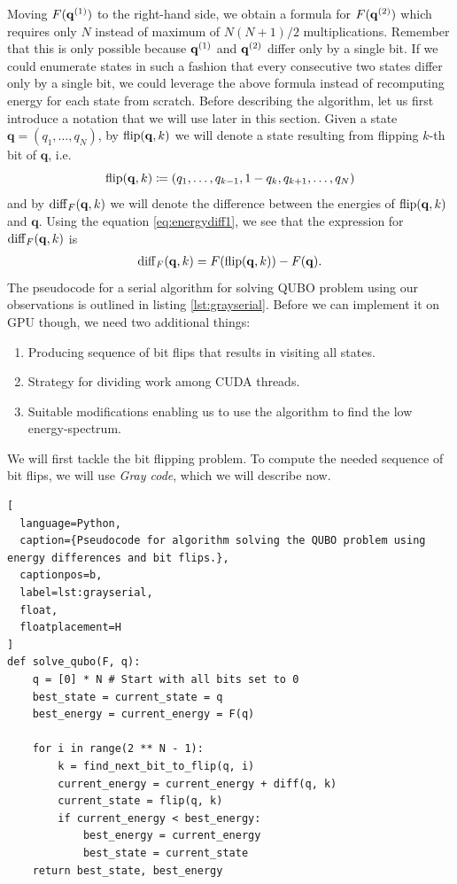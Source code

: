 Moving $F(\mathbf{q}^{(1)})$ to the right-hand side, we obtain a formula for $F(\mathbf{q}^{(2)})$ which requires only $N$ instead of maximum of $N(N+1)/2$ multiplications. Remember that this is only possible because $\mathbf{q}^{(1)}$ and $\mathbf{q}^{(2)}$ differ only by a single bit. If we could enumerate states in such a fashion that every consecutive two states differ only by a single bit, we could leverage the above formula instead of recomputing energy for each state from scratch. Before describing the algorithm, let us first introduce a notation that we will use later in this section. Given a state $\mathbf{q} = (q_{1},\ldots,q_{N})$, by $\operatorname*{flip}(\mathbf{q},k)$ we will denote  a state resulting from flipping $k$-th bit of $\mathbf{q}$, i.e.
\begin{equation}
  \operatorname*{flip}(\mathbf{q},k) \coloneq (q_{1}, \ldots, q_{k-1}, 1-q_{k}, q_{k+1}, \ldots, q_{N})
\end{equation}
and by $\operatorname{diff}_{F}(\mathbf{q},k)$ we will denote the difference between the energies of $\operatorname*{flip}(\mathbf{q},k)$ and $\mathbf{q}$. Using the equation \eqref{eq:energydiff1}, we see that the expression for $\operatorname{diff}_{F}(\mathbf{q},k)$ is
\begin{align}
  \begin{split}
    \operatorname{diff}_{F}(\mathbf{q},k) = F(\operatorname*{flip}(\mathbf{q},k)) - F(\mathbf{q}).
  \end{split}
\end{align}
The pseudocode for a serial algorithm for solving QUBO problem using our observations is outlined in listing \ref{lst:grayserial}. Before we can implement it on GPU though, we need two additional things:
\begin{enumerate}
  \item Producing sequence of bit flips that results in visiting all states.
  \item Strategy for dividing work among CUDA threads.
  \item Suitable modifications enabling us to use the algorithm to find the low energy-spectrum.
\end{enumerate}
We will first tackle the bit flipping problem. To compute the needed sequence of bit flips, we will use \emph{Gray code}, which we will describe now.
\begin{lstlisting}[
  language=Python,
  caption={Pseudocode for algorithm solving the QUBO problem using energy differences and bit flips.},
  captionpos=b,
  label=lst:grayserial,
  float,
  floatplacement=H
]
def solve_qubo(F, q):
    q = [0] * N # Start with all bits set to 0
    best_state = current_state = q
    best_energy = current_energy = F(q)

    for i in range(2 ** N - 1):
        k = find_next_bit_to_flip(q, i)
        current_energy = current_energy + diff(q, k)
        current_state = flip(q, k)
        if current_energy < best_energy:
            best_energy = current_energy
            best_state = current_state
    return best_state, best_energy
\end{lstlisting}
